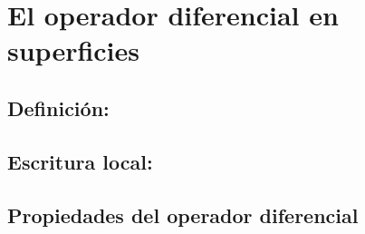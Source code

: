 \documentclass{article}
\begin{document}
   \section{El operador diferencial en superficies}\label{sec:OpDif}
   \subsection{Definición:}
   
   \subsection{Escritura local:}
   
   \subsection{Propiedades del operador diferencial}
   
\end{document}

